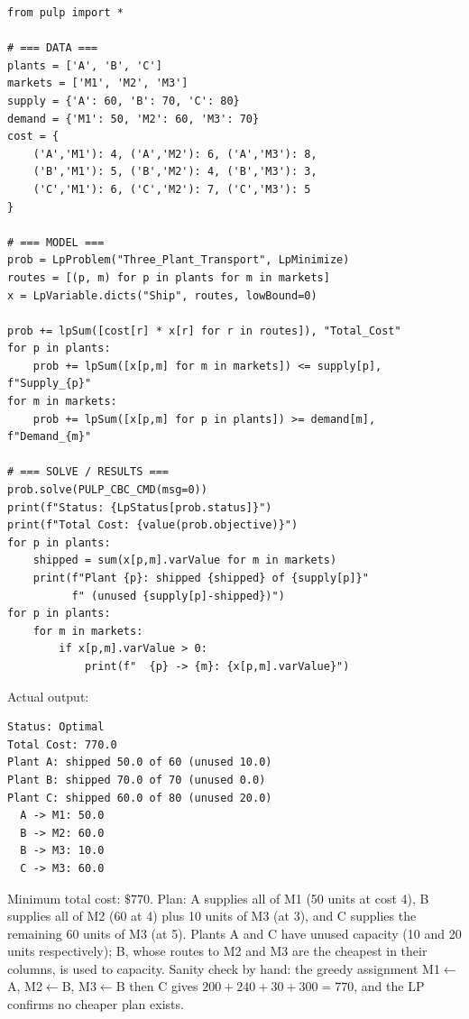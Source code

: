 
\begin{verbatim}
from pulp import *

# === DATA ===
plants = ['A', 'B', 'C']
markets = ['M1', 'M2', 'M3']
supply = {'A': 60, 'B': 70, 'C': 80}
demand = {'M1': 50, 'M2': 60, 'M3': 70}
cost = {
    ('A','M1'): 4, ('A','M2'): 6, ('A','M3'): 8,
    ('B','M1'): 5, ('B','M2'): 4, ('B','M3'): 3,
    ('C','M1'): 6, ('C','M2'): 7, ('C','M3'): 5
}

# === MODEL ===
prob = LpProblem("Three_Plant_Transport", LpMinimize)
routes = [(p, m) for p in plants for m in markets]
x = LpVariable.dicts("Ship", routes, lowBound=0)

prob += lpSum([cost[r] * x[r] for r in routes]), "Total_Cost"
for p in plants:
    prob += lpSum([x[p,m] for m in markets]) <= supply[p], f"Supply_{p}"
for m in markets:
    prob += lpSum([x[p,m] for p in plants]) >= demand[m], f"Demand_{m}"

# === SOLVE / RESULTS ===
prob.solve(PULP_CBC_CMD(msg=0))
print(f"Status: {LpStatus[prob.status]}")
print(f"Total Cost: {value(prob.objective)}")
for p in plants:
    shipped = sum(x[p,m].varValue for m in markets)
    print(f"Plant {p}: shipped {shipped} of {supply[p]}"
          f" (unused {supply[p]-shipped})")
for p in plants:
    for m in markets:
        if x[p,m].varValue > 0:
            print(f"  {p} -> {m}: {x[p,m].varValue}")
\end{verbatim}

Actual output:

\begin{verbatim}
Status: Optimal
Total Cost: 770.0
Plant A: shipped 50.0 of 60 (unused 10.0)
Plant B: shipped 70.0 of 70 (unused 0.0)
Plant C: shipped 60.0 of 80 (unused 20.0)
  A -> M1: 50.0
  B -> M2: 60.0
  B -> M3: 10.0
  C -> M3: 60.0
\end{verbatim}

Minimum total cost: $\$770$. Plan: A supplies all of M1 (50 units at cost 4),
B supplies all of M2 (60 at 4) plus 10 units of M3 (at 3), and C supplies the
remaining 60 units of M3 (at 5). Plants A and C have unused capacity (10 and
20 units respectively); B, whose routes to M2 and M3 are the cheapest in
their columns, is used to capacity. Sanity check by hand: the greedy
assignment M1$\leftarrow$A, M2$\leftarrow$B, M3$\leftarrow$B then C gives
$200 + 240 + 30 + 300 = 770$, and the LP confirms no cheaper plan exists.


